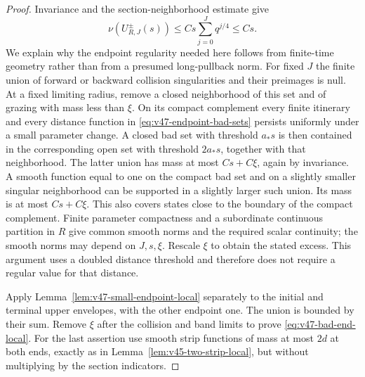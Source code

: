 \begin{proof}
Invariance and the section-neighborhood estimate give
\[
 \nu(U^\pm_{R,J}(s))
       \le C s\sum_{j=0}^Jq^{j/4}\le C s.
\]
We explain why the endpoint regularity needed here follows from
finite-time geometry rather than from a presumed long-pullback norm.
For fixed $J$ the finite union of forward or backward collision
singularities and their preimages is null. At a fixed limiting radius,
remove a closed neighborhood of this set and of grazing with mass
less than $\xi$. On its compact complement every finite itinerary
and every distance function in \eqref{eq:v47-endpoint-bad-sets}
persists uniformly under a small parameter change. A closed bad set
with threshold $a_*s$ is then contained in the corresponding open
set with threshold $2a_*s$, together with that neighborhood.
The latter union has mass at most $Cs+C\xi$, again by invariance.
A smooth function equal to one on the compact bad set and on a
slightly smaller singular neighborhood can be supported in a slightly
larger such union. Its mass is at most $Cs+C\xi$. This also covers
states close to the boundary of the compact complement. Finite
parameter compactness and a subordinate continuous partition in $R$
give common smooth norms and the required scalar continuity; the
smooth norms may depend on $J,s,\xi$. Rescale $\xi$ to obtain the
stated excess. This argument uses a doubled distance threshold and
therefore does not require a regular value for that distance.

Apply Lemma~\ref{lem:v47-small-endpoint-local} separately to the
initial and terminal upper envelopes, with the other endpoint one.
The union is bounded by their sum. Remove $\xi$ after the collision
and band limits to prove \eqref{eq:v47-bad-end-local}. For the last
assertion use smooth strip functions of mass at most $2d$ at both
ends, exactly as in Lemma~\ref{lem:v45-two-strip-local}, but without
multiplying by the section indicators.
\end{proof}

